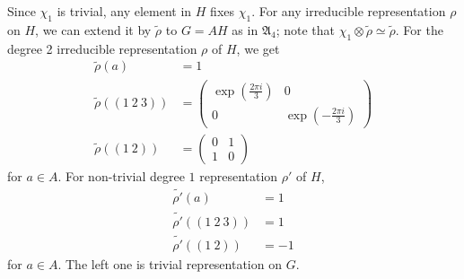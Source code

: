\documentclass[a4paper, 12pt]{article}
\theoremstyle{Mydefinition}
\theoremstyle{Mytheorem}
\begin{document}
\begin{enumerate}
    Since $\chi_1$ is trivial, any element in $H$ fixes $\chi_1$. For any irreducible representation $\rho$ on $H$, we can extend it by $\tilde{\rho}$ to $G=AH$ as in $\mathfrak{A}_4$; note that $\chi_1\otimes \tilde{\rho}\simeq \tilde{\rho}$. For the degree 2 irreducible representation $\rho$ of $H$, we get
    \begin{equation}
    \begin{split}
        \tilde{\rho}(a) &= 1\\
        \tilde{\rho}((1~2~3)) &= \begin{pmatrix}
        \exp\left(\frac{2\pi i}{3}\right) & 0\\
        0 & \exp\left(-\frac{2\pi i}{3}\right)
        \end{pmatrix}\\
        \tilde{\rho}((1~2)) &= \begin{pmatrix}
        0 & 1\\
        1 & 0
        \end{pmatrix}
    \end{split} 
    \end{equation}
    for $a\in A$. For non-trivial degree $1$ representation $\rho'$ of $H$,    \begin{equation}
    \begin{split}
        \tilde{\rho'}(a) &= 1\\
        \tilde{\rho'}((1~2~3)) &= 1\\
        \tilde{\rho'}((1~2)) &= -1
    \end{split} 
    \end{equation}
    for $a\in A$. The left one is trivial representation on $G$.
    

\end{enumerate}
\end{document}
